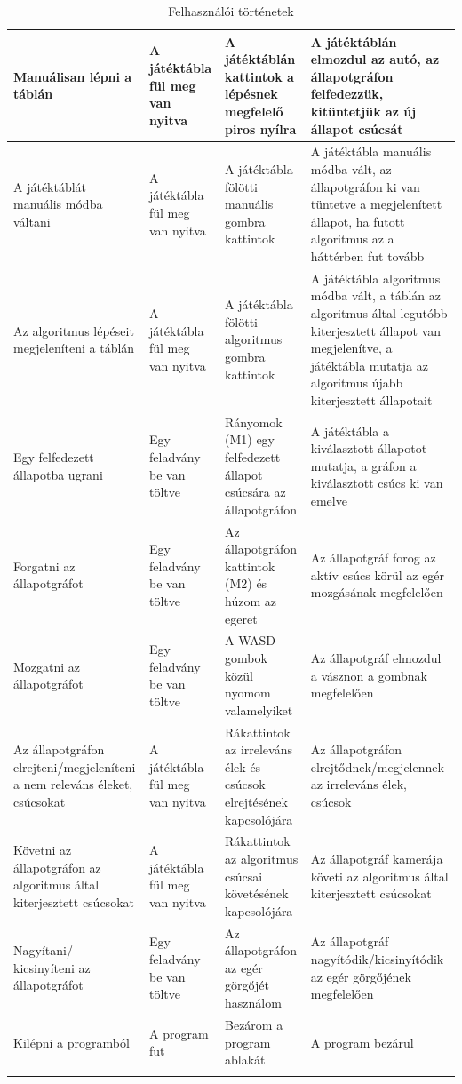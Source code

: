 \begin{center}
\begin{longtable}{ | p{} | p{} | p{} | p{} | }
Manuálisan lépni a táblán & A játéktábla fül meg van nyitva & A játéktáblán kattintok a lépésnek megfelelő piros nyílra & A játéktáblán elmozdul az autó, az állapotgráfon felfedezzük, kitüntetjük az új állapot csúcsát \\ \hline
A játéktáblát manuális módba váltani & A játéktábla fül meg van nyitva & A játéktábla fölötti manuális gombra kattintok & A játéktábla manuális módba vált, az állapotgráfon ki van tüntetve a megjelenített állapot, ha futott algoritmus az a háttérben fut tovább \\ \hline
Az algoritmus lépéseit megjeleníteni a táblán & A játéktábla fül meg van nyitva & A játéktábla fölötti algoritmus gombra kattintok & A játéktábla algoritmus módba vált, a táblán az algoritmus által legutóbb kiterjesztett állapot van megjelenítve, a játéktábla mutatja az algoritmus újabb kiterjesztett állapotait \\ \hline
Egy felfedezett állapotba ugrani & Egy feladvány be van töltve & Rányomok (M1) egy felfedezett állapot csúcsára az állapotgráfon & A játéktábla a kiválasztott állapotot mutatja, a gráfon a kiválasztott csúcs ki van emelve \\ \hline
Forgatni az állapotgráfot & Egy feladvány be van töltve & Az állapotgráfon kattintok (M2) és húzom az egeret & Az állapotgráf forog az aktív csúcs körül az egér mozgásának megfelelően \\ \hline
Mozgatni az állapotgráfot & Egy feladvány be van töltve & A WASD gombok közül nyomom valamelyiket & Az állapotgráf elmozdul a vásznon a gombnak megfelelően \\ \hline
Az állapotgráfon elrejteni/megjeleníteni a nem releváns éleket, csúcsokat & A játéktábla fül meg van nyitva & Rákattintok az irreleváns élek és csúcsok elrejtésének kapcsolójára & Az állapotgráfon elrejtődnek/megjelennek az irreleváns élek, csúcsok \\ \hline
Követni az állapotgráfon az algoritmus által kiterjesztett csúcsokat & A játéktábla fül meg van nyitva & Rákattintok az algoritmus csúcsai követésének kapcsolójára & Az állapotgráf kamerája követi az algoritmus által kiterjesztett csúcsokat \\ \hline
Nagyítani/ kicsinyíteni az állapotgráfot & Egy feladvány be van töltve & Az állapotgráfon az egér görgőjét használom & Az állapotgráf nagyítódik/kicsinyítódik az egér görgőjének megfelelően \\ \hline
Kilépni a programból & A program fut & Bezárom a program ablakát & A program bezárul \\ \hline
\caption{Felhasználói történetek}
\label{tab:userstory}
\end{longtable}
\end{center}


